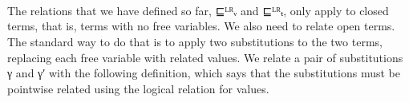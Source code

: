 \begin{code}
\AgdaOperator{\AgdaInductiveConstructor{,}}\AgdaSpace{}%
\AgdaSpace{}%
\AgdaOperator{\AgdaInductiveConstructor{,}}\AgdaSpace{}%
\AgdaSymbol{))}\<%
\\
%
\\[\AgdaEmptyExtraSkip]%
\>[0]\AgdaSpace{}%
\AgdaSymbol{:}\AgdaSpace{}%
\AgdaSpace{}%
\AgdaSpace{}%
\AgdaSpace{}%
\AgdaSpace{}%
\AgdaSpace{}%
\AgdaSymbol{\}}\AgdaSpace{}%
\AgdaSpace{}%
\AgdaSpace{}%
\AgdaSpace{}%
\AgdaSpace{}%
\AgdaSpace{}%
\<%
\\
\>[0]\AgdaSpace{}%
\AgdaSpace{}%
\AgdaSpace{}%
\AgdaSpace{}%
\AgdaSpace{}%
\AgdaSymbol{=}\AgdaSpace{}%
\AgdaSymbol{(}\AgdaSpace{}%
\AgdaSpace{}%
\AgdaSpace{}%
\AgdaSpace{}%
\AgdaSpace{}%
\AgdaSpace{}%
\AgdaSymbol{)}\AgdaSpace{}%
\AgdaSpace{}%
\AgdaSymbol{(}\AgdaSpace{}%
\AgdaSpace{}%
\AgdaSpace{}%
\AgdaSpace{}%
\AgdaSpace{}%
\AgdaSpace{}%
\AgdaSymbol{)}\<%
\end{code}

The relations that we have defined so far, ⊑ᴸᴿᵥ and ⊑ᴸᴿₜ, only apply
to closed terms, that is, terms with no free variables.  We also need
to relate open terms. The standard way to do that is to apply two
substitutions to the two terms, replacing each free variable with
related values. We relate a pair of substitutions γ and γ′ with the
following definition, which says that the substitutions must be
pointwise related using the logical relation for values.

